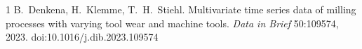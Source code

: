 \documentclass[10pt,twocolumn]{article}
\begin{document}

\begin{thebibliography}{1}
 B.~Denkena, H.~Klemme, T.~H.~Stiehl. Multivariate time series data of milling processes with varying tool wear and machine tools. \emph{Data in Brief} 50:109574, 2023. doi:10.1016/j.dib.2023.109574
\end{thebibliography}
\end{document}
